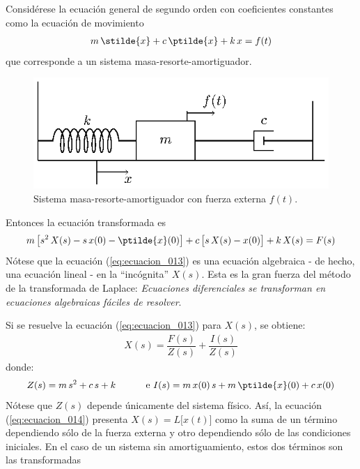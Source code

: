 Considérese la ecuación general de segundo orden con coeficientes constantes como la ecuación de movimiento
\begin{align*}
m \, \stilde{x} + c \, \ptilde{x} + k \, x =  f(t)
\end{align*}
que corresponde a un sistema masa-resorte-amortiguador.
\begin{figure}[H]
    \centering
    \includegraphics[scale=1.3]{Imagenes/sist_masa_resorte_dump.eps}
    \caption{Sistema masa-resorte-amortiguador con fuerza externa $f(t)$.}
    \label{fig:figura_007}
\end{figure}
Entonces la ecuación transformada es
\begin{align}
m \, \big[ s^{2} \, X(s) - s \, x(0) - \ptilde{x}(0) \big] + c \, \big[ s \, X(s) - x(0) \big] + k \, X(s) = F(s)
\label{eq:ecuacion_013}
\end{align}
Nótese que la ecuación (\ref{eq:ecuacion_013}) es una ecuación algebraica  - de hecho, una ecuación lineal - en la \enquote{incógnita} $X(s)$. Esta es la gran fuerza del método de la transformada de Laplace: \emph{Ecuaciones diferenciales se transforman en ecuaciones algebraicas fáciles de resolver}.
\par
Si se resuelve la ecuación (\ref{eq:ecuacion_013}) para $X(s)$, se obtiene:
\begin{align}
X(s) = \dfrac{F(s)}{Z(s)} + \dfrac{I(s)}{Z(s)}
\label{eq:ecuacion_014}
\end{align}
donde:
\begin{align*}
Z(s) = m \, s^{2} + c \, s + k \hspace{1cm} \mbox{ e }  I(s) = m \, x(0) \, s + m \, \ptilde{x} (0) + c \, x(0)
\end{align*}
Nótese que $Z(s)$ depende únicamente del sistema físico. Así, la ecuación (\ref{eq:ecuacion_014}) presenta $X(s)= L \big[x(t)\big]$ como la suma de un término dependiendo sólo de la fuerza externa y otro dependiendo sólo de las condiciones iniciales. En el caso de un sistema sin amortiguamiento, estos dos términos son las transformadas
